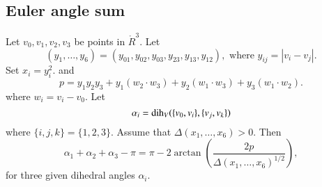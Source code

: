 \subsection{Euler angle sum}
\begin{lemma}\label{lemma:euler}
Let $v_0,v_1,v_2,v_3$ be points in $\ring{R}^3$. 
Let 
  $$(y_1,\ldots,y_6) =(y_{01},y_{02},y_{03},y_{23},y_{13},y_{12}),
   \text{ where } y_{ij}=|v_i-v_j|.$$
Set
$x_i = y_i^2$.   
and
    $$
    p = y_1 y_2 y_3 + y_1 (w_2\cdot w_3) + y_2 (w_1\cdot w_3) + y_3
    (w_1\cdot w_2).
    $$
where $w_i = v_i- v_0$.
Let $$\alpha_i =\operatorname{dih}_V(\{v_0,v_i\},\{v_j,v_k\})$$
where $\{i,j,k\}=\{1,2,3\}$.
Assume that $\Delta(x_1,\ldots,x_6)>0$. 
Then
    $$
    \alpha_1+\alpha_2+\alpha_3 - \pi
     = {\pi} - 2\arctan(\frac{2 p}{\Delta(x_1,\ldots,x_6)^{1/2}}),
    $$
for three given dihedral angles $\alpha_i$.
\end{lemma}

